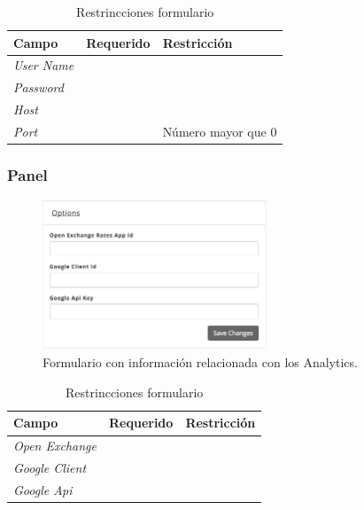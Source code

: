 \begin{table}[H]
    \centering
	\begin{tabular}{ |l|c||l| }
		\hline Campo & Requerido & Restricción \\ \hline
		\multirow{1}{*}{\textit{User Name}} &  {\checkmark} &  \\ \hline
		\multirow{1}{*}{\textit{Password}} 	&  {\checkmark} &  \\ \hline
		\multirow{1}{*}{\textit{Host}} 		&  {\checkmark} &  \\ \hline
		\multirow{1}{*}{\textit{Port}} 		&  {\checkmark} & Número mayor que 0 \\ \hline
		\hline
	\end{tabular}
 	\caption{Restrincciones formulario \mailPanel}
    \label{tab:dashboard:ecommerce:form:mail}
\end{table}


\subsubsection*{Panel \optionsPanel}

\begin{figure}[H]
	\centering
	\includegraphics[width=0.6\textwidth]{figuras/dashboard/ecommerce/options/menu.png}
	\caption{Formulario con información relacionada con los Analytics.}
	\label{figure:dashboard:ecommerce:options:menu}
\end{figure}

\begin{table}[H]
    \centering
	\begin{tabular}{ |l|c||l| }
		\hline Campo & Requerido & Restricción \\ \hline
		\multirow{1}{*}{\textit{Open Exchange}} 	&  {\checkmark} &  \\ \hline
		\multirow{1}{*}{\textit{Google Client}} 	&  {\checkmark} &  \\ \hline
		\multirow{1}{*}{\textit{Google Api}} 		&  {\checkmark} &  \\ \hline
		\hline
	\end{tabular}
 	\caption{Restrincciones formulario \optionsPanel}
    \label{tab:dashboard:ecommerce:form:options}
\end{table}

